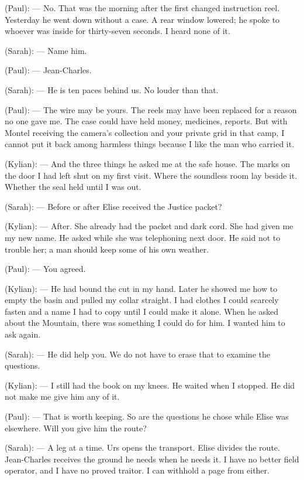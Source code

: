 \begin{room}
(Paul): --- No. That was the morning after the first changed instruction reel. Yesterday he went down without a case. A rear window lowered; he spoke to whoever was inside for thirty-seven seconds. I heard none of it.

(Sarah): --- Name him.

(Paul): --- Jean-Charles.

\centerline{}

(Sarah): --- He is ten paces behind us. No louder than that.

(Paul): --- The wire may be yours. The reels may have been replaced for a reason no one gave me. The case could have held money, medicines, reports. But with Montel receiving the camera's collection and your private grid in that camp, I cannot put it back among harmless things because I like the man who carried it.

(Kylian): --- And the three things he asked me at the safe house. The marks on the door I had left shut on my first visit. Where the soundless room lay beside it. Whether the seal held until I was out.

(Sarah): --- Before or after Elise received the Justice packet?

(Kylian): --- After. She already had the packet and dark cord. She had given me my new name. He asked while she was telephoning next door. He said not to trouble her; a man should keep some of his own weather.

(Paul): --- You agreed.

(Kylian): --- He had bound the cut in my hand. Later he showed me how to empty the basin and pulled my collar straight. I had clothes I could scarcely fasten and a name I had to copy until I could make it alone. When he asked about the Mountain, there was something I could do for him. I wanted him to ask again.

(Sarah): --- He did help you. We do not have to erase that to examine the questions.

(Kylian): --- I still had the book on my knees. He waited when I stopped. He did not make me give him any of it.

(Paul): --- That is worth keeping. So are the questions he chose while Elise was elsewhere. Will you give him the route?

(Sarah): --- A leg at a time. Urs opens the transport. Elise divides the route. Jean-Charles receives the ground he needs when he needs it. I have no better field operator, and I have no proved traitor. I can withhold a page from either.


\end{room}

